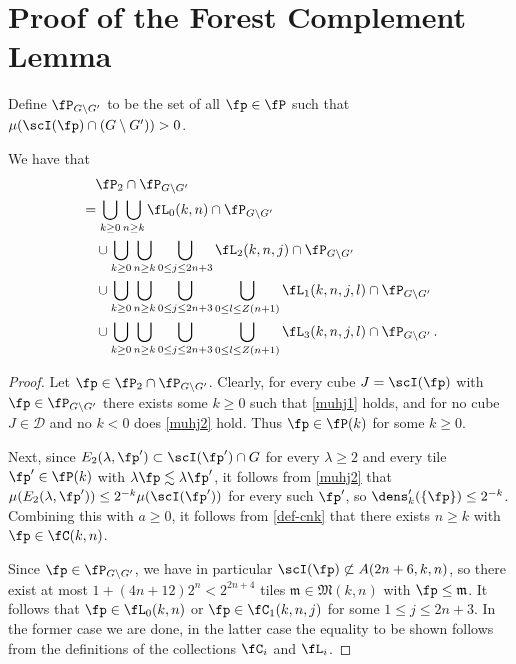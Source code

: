 \section{Proof of the Forest Complement Lemma}
\label{subsecantichain}

Define $\fP_{G \setminus G'}$ to be the set of all $\fp \in \fP$ such that $\mu(\scI(\fp) \cap (G \setminus  G')) > 0$.
\begin{lemma}
    \label{antichain-decomposition}
    \leanok
    We have that
    \begin{align}
        \label{eq-fp'-decomposition}
        &\quad \fP_2 \cap \fP_{G \setminus G'}\\
        &= \bigcup_{k \ge 0} \bigcup_{n \ge k} \fL_0(k,n) \cap \fP_{G \setminus G'} \\
        &\quad\cup \bigcup_{k \ge 0} \bigcup_{n \ge k}\bigcup_{0 \le j \le 2n+3} \fL_2(k,n,j) \cap \fP_{G \setminus G'}\\
        &\quad\cup \bigcup_{k \ge 0} \bigcup_{n \ge k}\bigcup_{0 \le j \le 2n+3} \bigcup_{0 \le l \le Z(n+1)} \fL_1(k,n,j,l) \cap \fP_{G \setminus G'}\\
        &\quad\cup \bigcup_{k \ge 0} \bigcup_{n \ge k}\bigcup_{0 \le j \le 2n+3} \bigcup_{0 \le l \le Z(n+1)} \fL_3(k,n,j,l)\cap \fP_{G \setminus G'}\,.
    \end{align}
\end{lemma}

\begin{proof}
    \leanok
    Let $\fp \in \fP_2 \cap \fP_{G \setminus G'}$. Clearly, for every cube $J = \scI(\fp)$ with $\fp \in \fP_{G \setminus G'}$ there exists some $k \ge 0$ such that \eqref{muhj1} holds, and for no cube $J \in \mathcal{D}$ and no $k < 0$ does \eqref{muhj2} hold. Thus $\fp \in \fP(k)$ for some $k \ge 0$.

    Next, since $E_2(\lambda, \fp') \subset \scI(\fp')\cap G$ for every $\lambda \ge 2$ and every tile $\fp' \in \fP(k)$ with $\lambda\fp \lesssim \lambda \fp'$, it follows from \eqref{muhj2} that $\mu(E_2(\lambda, \fp')) \le 2^{-k} \mu(\scI(\fp'))$ for every such $\fp'$, so $\dens_k'(\{\fp\}) \le 2^{-k}$. Combining this with $a \ge 0$, it follows from \eqref{def-cnk} that there exists $n\ge k$ with $\fp \in \fC(k,n)$.

    Since $\fp \in \fP_{G \setminus G'}$, we have in particular $\scI(\fp) \not \subset A(2n + 6, k, n)$, so there exist at most $1 + (4n + 12)2^n < 2^{2n+4}$ tiles $\mathfrak{m} \in \mathfrak{M}(k,n)$ with $\fp \le \mathfrak{m}$. It follows that $\fp \in \fL_0(k,n)$ or $\fp \in \fC_1(k,n,j)$ for some $1 \le j \le 2n + 3$. In the former case we are done, in the latter case the equality to be shown follows from the definitions of the collections $\fC_i$ and $\fL_i$.
\end{proof}

